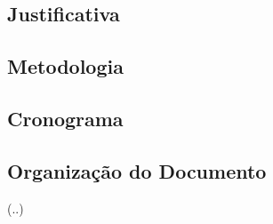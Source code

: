 \subsection{Justificativa}



\subsection{Metodologia}


\subsection{Cronograma}



\subsection{Organização do Documento}

(..)
